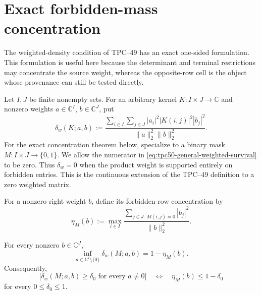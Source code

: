 \section{Exact forbidden-mass concentration}
\label{sec:tpc50-exact-concentration}

The weighted-density condition of TPC--49 has an exact one-sided
formulation.  This formulation is useful here because the determinant
and terminal restrictions may concentrate the source weight, whereas
the opposite-row cell is the object whose provenance can still be
tested directly.

Let \(I,J\) be finite nonempty sets.  For an arbitrary kernel
\(K:I\times J\to\mathbb C\) and nonzero weights
\(a\in\mathbb C^I\), \(b\in\mathbb C^J\), put
\begin{equation}
 \delta_w(K;a,b)
 :=
 \frac{\displaystyle
       \sum_{i\in I}\sum_{j\in J}
       |a_i|^2|K(i,j)|^2|b_j|^2}
      {\|a\|_2^2\|b\|_2^2}.
 \label{eq:tpc50-general-weighted-survival}
\end{equation}
For the exact concentration theorem below, specialize to a binary mask
\(M:I\times J\to\{0,1\}\).
We allow the numerator in \eqref{eq:tpc50-general-weighted-survival} to be
zero.  Thus \(\delta_w=0\) when the product weight is supported
entirely on forbidden entries.  This is the continuous extension of
the TPC--49 definition to a zero weighted matrix.

For a nonzero right weight \(b\), define its forbidden-row
concentration by
\begin{equation}
 \eta_M(b)
 :=
 \max_{i\in I}
 \frac{\displaystyle
       \sum_{j\in J:\,M(i,j)=0}|b_j|^2}
      {\|b\|_2^2}.
 \label{eq:tpc50-exact-forbidden-concentration}
\end{equation}

\begin{theorem}
\label{thm:tpc50-exact-concentration}
For every nonzero \(b\in\mathbb C^J\),
\begin{equation}
 \boxed{
 \inf_{a\in\mathbb C^I\setminus\{0\}}
 \delta_w(M;a,b)
 =1-\eta_M(b).}
 \label{eq:tpc50-exact-infimum}
\end{equation}
Consequently,
\begin{equation}
 \bigl[\delta_w(M;a,b)\ge\delta_0
       \text{ for every }a\ne0\bigr]
 \quad\Longleftrightarrow\quad
 \eta_M(b)\le1-\delta_0
 \label{eq:tpc50-exact-uniform-equivalence}
\end{equation}
for every \(0\le\delta_0\le1\).
\end{theorem}

